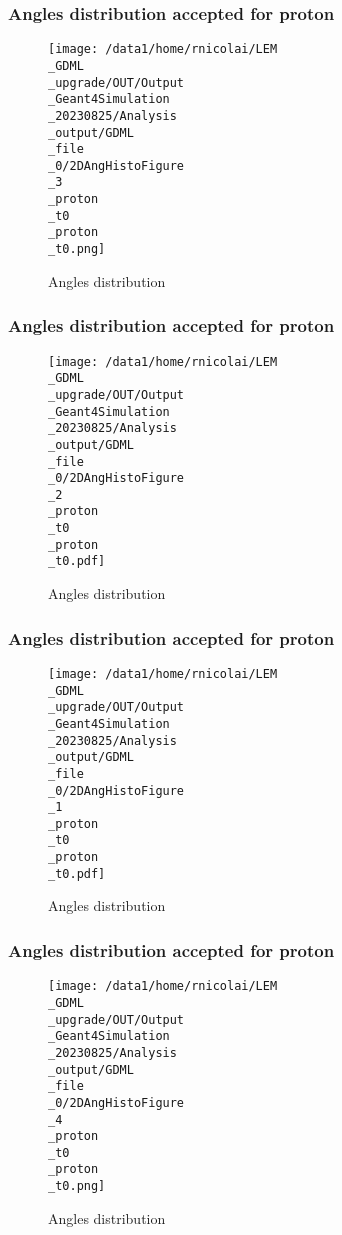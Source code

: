 \documentclass[8pt]{beamer}
\begin{document}
            \begin{frame}
                \frametitle{Angles distribution accepted for proton}
            
        \begin{figure}[h]
            \centering
            \texttt{[image: /data1/home/rnicolai/LEM\\\_GDML\\\_upgrade/OUT/Output\\\_Geant4Simulation\\\_20230825/Analysis\\\_output/GDML\\\_file\\\_0/2DAngHistoFigure\\\_3\\\_proton\\\_t0\\\_proton\\\_t0.png]}
            \caption{Angles distribution}
        \end{figure}
        
            \end{frame}
            
            \begin{frame}
                \frametitle{Angles distribution accepted for proton}
            
        \begin{figure}[h]
            \centering
            \texttt{[image: /data1/home/rnicolai/LEM\\\_GDML\\\_upgrade/OUT/Output\\\_Geant4Simulation\\\_20230825/Analysis\\\_output/GDML\\\_file\\\_0/2DAngHistoFigure\\\_2\\\_proton\\\_t0\\\_proton\\\_t0.pdf]}
            \caption{Angles distribution}
        \end{figure}
        
            \end{frame}
            
            \begin{frame}
                \frametitle{Angles distribution accepted for proton}
            
        \begin{figure}[h]
            \centering
            \texttt{[image: /data1/home/rnicolai/LEM\\\_GDML\\\_upgrade/OUT/Output\\\_Geant4Simulation\\\_20230825/Analysis\\\_output/GDML\\\_file\\\_0/2DAngHistoFigure\\\_1\\\_proton\\\_t0\\\_proton\\\_t0.pdf]}
            \caption{Angles distribution}
        \end{figure}
        
            \end{frame}
            
            \begin{frame}
                \frametitle{Angles distribution accepted for proton}
            
        \begin{figure}[h]
            \centering
            \texttt{[image: /data1/home/rnicolai/LEM\\\_GDML\\\_upgrade/OUT/Output\\\_Geant4Simulation\\\_20230825/Analysis\\\_output/GDML\\\_file\\\_0/2DAngHistoFigure\\\_4\\\_proton\\\_t0\\\_proton\\\_t0.png]}
            \caption{Angles distribution}
        \end{figure}
        
            \end{frame}
            
\end{document}
